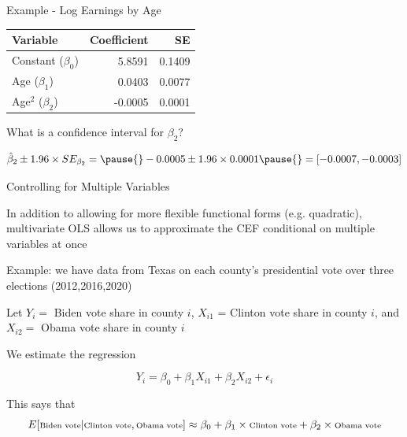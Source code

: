 \documentclass[11pt,english,handout]{beamer}
\newenvironment{wideitemize}{\itemize\addtolength{\itemsep}{10pt}}{\enditemize}
\begin{document}
	\begin{frame}{Example - Log Earnings by Age} 
		
		\begin{tabular}{lrr}
			Variable & Coefficient & SE \\ \hline
			Constant ($\beta_0$) & 5.8591 & 0.1409 \\
			Age ($\beta_1$) & 0.0403 &  0.0077\\
			Age$^2$ ($\beta_2$) & -0.0005 & 0.0001
		\end{tabular}
\medskip
		
		
		\begin{wideitemize}
			\item
			What is a confidence interval for $\beta_2$? 
			
			\pause{}
			$$\hat\beta_2 \pm 1.96 \times SE_{\beta_2} = \pause{} -0.0005 \pm 1.96 \times 0.0001 \pause{} = [-0.0007, -0.0003]  $$
		\end{wideitemize}
	\end{frame}


	\begin{frame}{Controlling for Multiple Variables} 
		\begin{wideitemize}
			\item
			In addition to allowing for more flexible functional forms (e.g. quadratic), multivariate OLS allows us to approximate the CEF conditional on multiple variables at once
			
			\pause
			\item
			Example: we have data from Texas on each county's presidential vote over three elections (2012,2016,2020)
			
			\pause
			\item
			Let $Y_i = $ Biden vote share in county $i$, $X_{i1}$ = Clinton vote share in county $i$, and $X_{i2} = $ Obama vote share in county $i$
			
			\pause
			\item
			We estimate the regression 
			
			$$Y_i = \beta_0 + \beta_1 X_{i1} + \beta_2 X_{i2} + \epsilon_i$$
			
			\pause
			\item 
			This says that 
			$$\scriptsize  E[  \text{Biden vote} | \text{Clinton vote} , \text{Obama vote} ] \approx \beta_0 + \beta_1 \times \text{Clinton vote} + \beta_2 \times \text{Obama vote}  $$
		\end{wideitemize}	
	\end{frame}
	
\end{document}
